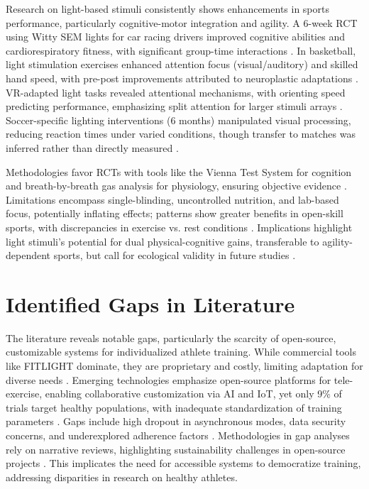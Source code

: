 Research on light-based stimuli consistently shows enhancements in sports performance, particularly cognitive-motor integration and agility. A 6-week RCT using Witty SEM lights for car racing drivers improved cognitive abilities and cardiorespiratory fitness, with significant group-time interactions \cite{Horvath:2022:ARA}. In basketball, light stimulation exercises enhanced attention focus (visual/auditory) and skilled hand speed, with pre-post improvements attributed to neuroplastic adaptations \cite{Shimi:2025:AML}. VR-adapted light tasks revealed attentional mechanisms, with orienting speed predicting performance, emphasizing split attention for larger stimuli arrays \cite{Shimi:2025:AML}. Soccer-specific lighting interventions (6 months) manipulated visual processing, reducing reaction times under varied conditions, though transfer to matches was inferred rather than directly measured \cite{Theofilou:2022:EVS}.

Methodologies favor RCTs with tools like the Vienna Test System for cognition and breath-by-breath gas analysis for physiology, ensuring objective evidence \cite{Horvath:2022:ARA}. Limitations encompass single-blinding, uncontrolled nutrition, and lab-based focus, potentially inflating effects; patterns show greater benefits in open-skill sports, with discrepancies in exercise vs. rest conditions \cite{Zhao:2024:RPS}. Implications highlight light stimuli's potential for dual physical-cognitive gains, transferable to agility-dependent sports, but call for ecological validity in future studies \cite{Shimi:2025:AML}.


\section{Identified Gaps in Literature}

The literature reveals notable gaps, particularly the scarcity of open-source, customizable systems for individualized athlete training. While commercial tools like FITLIGHT dominate, they are proprietary and costly, limiting adaptation for diverse needs \cite{Seckin:2023:RWT}. Emerging technologies emphasize open-source platforms for tele-exercise, enabling collaborative customization via AI and IoT, yet only 9\% of trials target healthy populations, with inadequate standardization of training parameters \cite{Rebelo:2023:FDA}. Gaps include high dropout in asynchronous modes, data security concerns, and underexplored adherence factors \cite{Rebelo:2023:FDA}. Methodologies in gap analyses rely on narrative reviews, highlighting sustainability challenges in open-source projects \cite{Seckin:2023:RWT}. This implicates the need for accessible systems to democratize training, addressing disparities in research on healthy athletes.